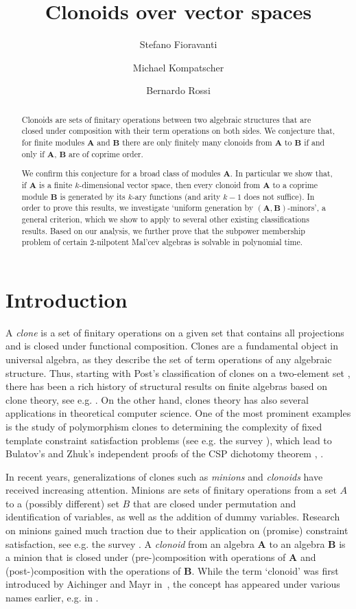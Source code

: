 \documentclass[11pt]{amsart}
\author[S.~Fioravanti]{Stefano Fioravanti}
\author[M.~Kompatscher]{Michael Kompatscher}
\author[B.~Rossi]{Bernardo Rossi}
\title{Clonoids over vector spaces}
\theoremstyle{plain}
\theoremstyle{definition}
\newcommand{\alg}[1]{\mathbf{#1}}
\newcommand{\algA}{\alg{A}}
\newcommand{\algB}{\alg{B}}
\begin{document}
\begin{abstract}
Clonoids are sets of finitary operations between two algebraic structures that are closed under composition with their term operations on both sides. We conjecture that, for finite modules $\algA$ and $\algB$ there are only finitely many clonoids from $\algA$ to $\algB$ if and only if $\algA$, $\algB$ are of coprime order.

We confirm this conjecture for a broad class of modules $\algA$. In particular we show that, if $\algA$ is a finite $k$-dimensional vector space, then every clonoid from $\alg A$ to a coprime module $\algB$ is generated by its $k$-ary functions (and arity $k-1$ does not suffice). In order to prove this results, we investigate `uniform generation by $(\algA,\algB)$-minors', a general criterion, which we show to apply to several other existing classifications results. Based on our analysis, we further prove that the subpower membership problem of certain 2-nilpotent Mal'cev algebras is solvable in polynomial time.
\end{abstract}

\maketitle

\section{Introduction}
A \emph{clone} is a set of finitary operations on a given set that contains all projections and is closed under functional composition. Clones are a fundamental object in universal algebra, as they describe the set of term operations of any algebraic structure. Thus, starting with Post's classification of clones on a two-element set \cite{post-lattice}, there has been a rich history of structural results on finite algebras based on clone theory, see e.g. \cite{szendrei-clones}. On the other hand, clones theory has also several applications in theoretical computer science. One of the most prominent examples is the study of polymorphism clones to determining the complexity of fixed template constraint satisfaction problems (see e.g. the survey \cite{BKW-polymorphisms}), which lead to Bulatov's and Zhuk's independent proofs of the CSP dichotomy theorem \cite{bulatov-dichotomy}, \cite{zhuk-dichotomy-short,zhuk-dichotomy}.

In recent years, generalizations of clones such as \emph{minions} and \emph{clonoids} have received increasing attention. Minions are sets of finitary operations from a set $A$ to a (possibly different) set $B$ that are closed under permutation and identification of variables, as well as the addition of dummy variables. Research on minions gained much traction due to their application on (promise) constraint satisfaction, see e.g. the survey \cite{BBKO-PCSP}. A \emph{clonoid} from an algebra $\algA$ to an algebra $\algB$ is a minion that is closed under (pre-)composition with operations of $\algA$ and (post-)composition with the operations of $\algB$. While the term `clonoid' was first introduced by Aichinger and Mayr in~\cite{AM-eqclasses}, the concept has appeared under various names earlier, e.g. in \cite{ CF-clonoids}. 
\end{document}

